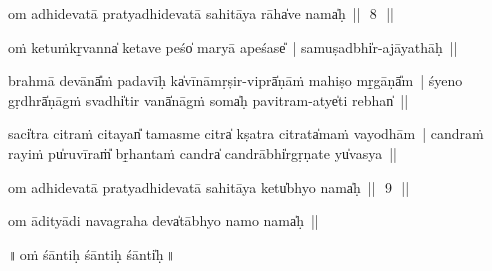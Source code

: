 \documentclass[parskip, DIV=14]{scrartcl}
\begin{document}
om adhidevatā pratyadhidevatā sahitāya rāha̍ve॒ nama̍ḥ~||~\,8\,~||
\vspace{0.5cm}


oṁ ke॒॒tuṁkṛ̱vanna̍ ke॒॒tave॒॒ peśo̍ maryā ape॒॒śase̎~| samu॒ṣadbhi̍r-ajāyathāḥ~||


bra॒hmā de॒॒vānā̎ṁ pada॒vīḥ ka̍vī॒nāmṛṣi॒r-viprā̍ṇāṁ mahi॒ṣo mṛ̱gāṇā̎m~| śye॒॒no gṛdhrā̍ṇā॒॒gṁ॒ svadhi̍ti॒r vanā̍nā॒॒gṁ॒ soma̍ḥ pa॒vitra॒m-atye̍ti॒ rebhan̍~||


saci̍tra ci॒traṁ citayan̎ tama॒sme citra̍ kṣatra ci॒trata̍maṁ vayo॒dhām~| ca॒ndraṁ ra॒yiṁ pu̍ru॒vīraṁ̎ bṛ̱hanta॒ṁ candra̍ ca॒ndrābhi̍rgṛṇa॒te yu̍vasya~||

om adhidevatā pratyadhidevatā sahitāya ketu̍bhyo॒ nama̍ḥ~||~\,9\,~||

\begin{center}
om ādityādi navagraha deva̍tābhyo॒ namo॒ nama̍ḥ~||
\vspace{1.5cm}

 ॥\,oṁ śānti॒ḥ śānti॒ḥ śānti̍ḥ\,॥
 \end{center}

\Large
\end{document}
